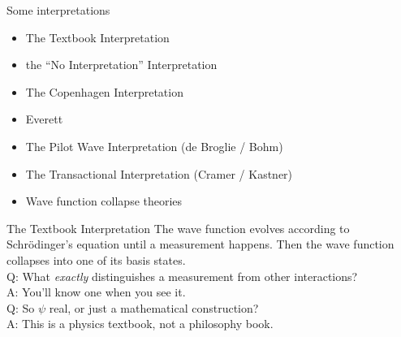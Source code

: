 \documentclass[9pt,usenames,dvipsnames]{beamer}
\begin{document}
\begin{frame}[t]{Some interpretations}
\begin{itemize}
\vspace{6pt}
\item The Textbook Interpretation
\vspace{6pt}
\item the ``No Interpretation'' Interpretation
\vspace{6pt}
\item The Copenhagen Interpretation
\vspace{6pt}
\item Everett
\vspace{6pt}
\item The Pilot Wave Interpretation (de Broglie / Bohm)
\vspace{6pt}
\item The Transactional Interpretation (Cramer / Kastner)
\vspace{6pt}
\item Wave function collapse theories
\end{itemize}
\end{frame}

\begin{frame}[t]{The Textbook Interpretation}
  \vspace{8pt}
  The wave function evolves according to Schr\"odinger's equation until
  a measurement happens. Then the wave function collapses into one of its
  basis states.
  \vspace{16pt}\\
  {\setlength\parindent{12pt}
    Q: What {\it exactly} distinguishes a measurement from other interactions?
    \vspace{8pt}\\
    A: You'll know one when you see it.
    \vspace{16pt}\\
    Q: So $\psi$ real, or just a mathematical construction?
    \vspace{8pt}\\
    A: This is a physics textbook, not a philosophy book.
  } 
\end{frame}
\end{document}
